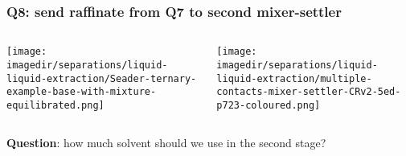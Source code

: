 \begin{frame}\frametitle{Q8: send raffinate from Q7 to second mixer-settler}

	\begin{columns}[t]
			\begin{center}
				\texttt{[image: \\imagedir/separations/liquid-liquid-extraction/Seader-ternary-example-base-with-mixture-equilibrated.png]}
			\end{center}
			\begin{center}
				\hspace{-3cm}
				\vspace{24pt}
				\texttt{[image: \\imagedir/separations/liquid-liquid-extraction/multiple-contacts-mixer-settler-CRv2-5ed-p723-coloured.png]}
			\end{center}
	\end{columns}
	\vspace{12pt}
	\textbf{Question}: how much solvent should we use in the second stage?	
\end{frame}


